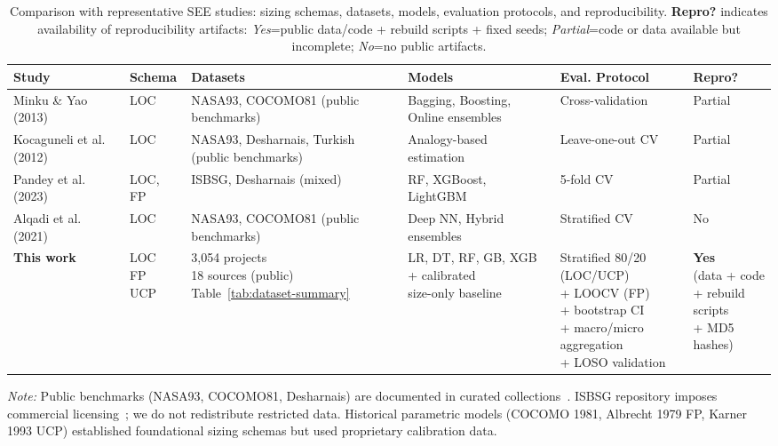 \documentclass{ieeeaccess}
\begin{document}
\begin{table}[ht]
\centering
\caption{Comparison with representative SEE studies: sizing schemas, datasets, models, evaluation protocols, and reproducibility. \textbf{Repro?} indicates availability of reproducibility artifacts: \textit{Yes}=public data/code + rebuild scripts + fixed seeds; \textit{Partial}=code or data available but incomplete; \textit{No}=no public artifacts.}
\label{tab:related-compare}
\small
\begin{tabular}{@{}p{3.0cm}p{1.3cm}p{2.8cm}p{2.5cm}p{2.8cm}p{1.3cm}@{}}
\toprule
\textbf{Study} & \textbf{Schema} & \textbf{Datasets} & \textbf{Models} & \textbf{Eval. Protocol} & \textbf{Repro?} \\
\midrule
Minku \& Yao (2013)~\cite{minku2013ensembles} & LOC & NASA93, COCOMO81 (public benchmarks)~\cite{jones2022estimation} & Bagging, Boosting, Online ensembles & Cross-validation & Partial \\
Kocaguneli et al. (2012)~\cite{kocaguneli2013exploiting} & LOC & NASA93, Desharnais, Turkish (public benchmarks) & Analogy-based estimation & Leave-one-out CV & Partial \\
Pandey et al. (2023)~\cite{pandey2023comprehensive} & LOC, FP & ISBSG, Desharnais (mixed) & RF, XGBoost, LightGBM & 5-fold CV & Partial \\
Alqadi et al. (2021)~\cite{alqadi2021deep} & LOC & NASA93, COCOMO81 (public benchmarks)~\cite{jones2022estimation} & Deep NN, Hybrid ensembles & Stratified CV & No \\
\midrule
\textbf{This work} & \makecell[l]{LOC\\FP\\UCP} & \makecell[l]{3,054 projects\\18 sources (public)\\Table~\ref{tab:dataset-summary}} & \makecell[l]{LR, DT, RF, GB, XGB\\+ calibrated\\size-only baseline} & \makecell[l]{Stratified 80/20 (LOC/UCP)\\+ LOOCV (FP)\\+ bootstrap CI\\+ macro/micro aggregation\\+ LOSO validation} & \makecell[l]{\textbf{Yes}\\(data + code\\+ rebuild scripts\\+ MD5 hashes)} \\
\bottomrule
\end{tabular}
\vspace{0.3em}
\raggedright\footnotesize
\textit{Note:} Public benchmarks (NASA93, COCOMO81, Desharnais) are documented in curated collections~\cite{jones2022estimation,rodriguez2023dase}. ISBSG repository imposes commercial licensing~\cite{isbsg2025overview}; we do not redistribute restricted data. Historical parametric models (COCOMO 1981, Albrecht 1979 FP, Karner 1993 UCP) established foundational sizing schemas but used proprietary calibration data.
\end{table}
\end{document}
